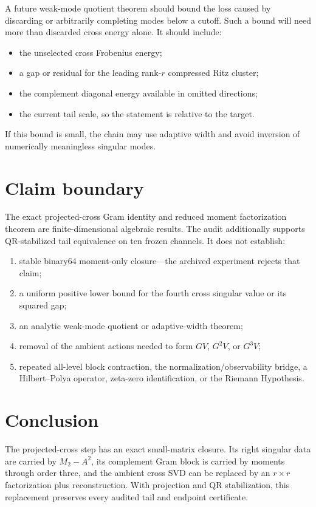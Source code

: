 \documentclass[11pt]{article}
\theoremstyle{definition}
\theoremstyle{remark}
\begin{document}
A future weak-mode quotient theorem should bound the loss caused by
discarding or arbitrarily completing modes below a cutoff.  Such a bound will
need more than discarded cross energy alone.  It should include:
\begin{itemize}[leftmargin=2em]
\item the unselected cross Frobenius energy;
\item a gap or residual for the leading rank-$r$ compressed Ritz cluster;
\item the complement diagonal energy available in omitted directions;
\item the current tail scale, so the statement is relative to the target.
\end{itemize}
If this bound is small, the chain may use adaptive width and avoid inversion
of numerically meaningless singular modes.

\section{Claim boundary}

The exact projected-cross Gram identity and reduced moment factorization
theorem are finite-dimensional algebraic results.  The audit additionally
supports QR-stabilized tail equivalence on ten frozen channels.  It does not
establish:
\begin{enumerate}[leftmargin=2em]
\item stable binary64 moment-only closure---the archived experiment rejects
that claim;
\item a uniform positive lower bound for the fourth cross singular value or
its squared gap;
\item an analytic weak-mode quotient or adaptive-width theorem;
\item removal of the ambient actions needed to form $GV$, $G^2V$, or $G^3V$;
\item repeated all-level block contraction, the normalization/observability
bridge, a Hilbert--Polya operator, zeta-zero identification, or the Riemann
Hypothesis.
\end{enumerate}

\section{Conclusion}

The projected-cross step has an exact small-matrix closure.  Its right
singular data are carried by $M_2-A^2$, its complement Gram block is carried
by moments through order three, and the ambient cross SVD can be replaced by
an $r\times r$ factorization plus reconstruction.  With projection and QR
stabilization, this replacement preserves every audited tail and endpoint
certificate.
\end{document}
